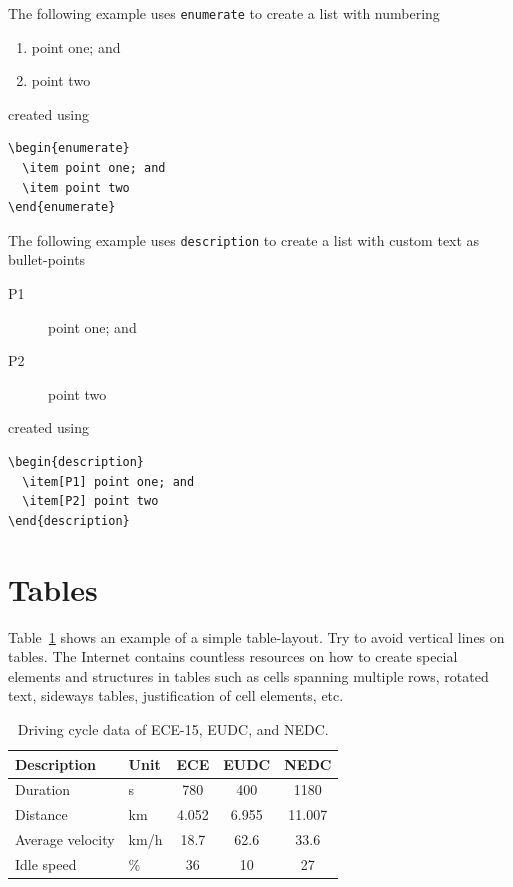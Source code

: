 The following example uses \texttt{enumerate} to create a list with numbering
\begin{enumerate}
  \item point one; and
  \item point two
\end{enumerate}
created using
\begin{verbatim}
\begin{enumerate}
  \item point one; and
  \item point two
\end{enumerate}
\end{verbatim}

The following example uses \texttt{description} to create a list with custom text as bullet-points
\begin{description}
  \item[P1] point one; and
  \item[P2] point two
\end{description}
created using
\begin{verbatim}
\begin{description}
  \item[P1] point one; and
  \item[P2] point two
\end{description}
\end{verbatim}


\section{Tables}\label{sec:tables}
Table~\ref{tab:table} shows an example of a simple table-layout. Try to avoid vertical lines on tables. The Internet contains countless resources on how to create special elements and structures in tables such as cells spanning multiple rows, rotated text, sideways tables, justification of cell elements, etc.
\begin{table}[h]
\begin{center}
\caption{Driving cycle data of ECE-15, EUDC, and NEDC.}\vspace{1ex}
\label{tab:table}
\begin{tabular}{llccc}\hline
Description & Unit & ECE & EUDC & NEDC \\ \hline
Duration & s & 780 & 400 & 1180 \\
Distance & km & 4.052 & 6.955 & 11.007 \\
Average velocity & km/h & 18.7 &  62.6 & 33.6 \\
Idle speed & \% & 36 & 10 & 27 \\ \hline
\end{tabular}
\end{center}
\end{table}

